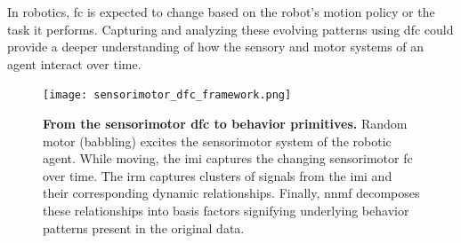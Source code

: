 \documentclass[letterpaper, 10 pt, conference]{ieeeconf}  %
\begin{document}
In robotics, \ac{fc} is expected to change based on the robot’s motion policy or the task it performs. Capturing and analyzing these evolving patterns using \ac{dfc} could provide a deeper understanding of how the sensory and motor systems of an agent interact over time.

\begin{figure}[h!]
	\centering
	\texttt{[image: sensorimotor\_dfc\_framework.png]}
	\caption{\textbf{From the sensorimotor \acl{dfc} to behavior primitives.} Random motor (babbling) excites the sensorimotor system of the robotic agent. While moving, the \ac{imi} captures the changing sensorimotor \ac{fc} over time. The \ac{irm} captures clusters of signals from the \ac{imi} and their corresponding dynamic relationships. Finally, \ac{nnmf} decomposes these relationships into basis factors signifying underlying behavior patterns present in the original data.}
	\label{fig:framework_overview}
\end{figure}

\end{document}
